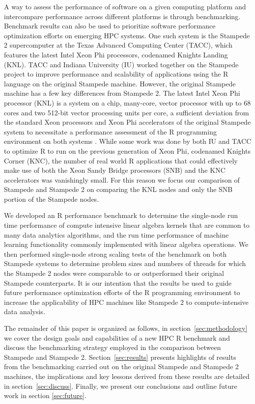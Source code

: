 A way to assess the performance of software on a given computing platform and intercompare
performance across different platforms is through benchmarking. Benchmark results can also
be used to prioritize software performance optimization efforts on emerging HPC systems.
One such system is the Stampede 2 supercomputer at the Texas Advanced Computing Center
(TACC), which features the latest Intel Xeon Phi processors, codenamed Knights Landing
(KNL). TACC and Indiana University (IU) worked together on the Stampede project to
improve performance and scalability of applications using the R language on the original
Stampede machine. However, the original Stampede machine has a few key differences from
Stampede 2. The latest Intel Xeon Phi processor (KNL) is a system on a chip, many-core, vector processor
with up to 68 cores and two 512-bit vector processing units per core, a sufficient
deviation from the standard Xeon processors and Xeon Phi accelerators of the original
Stampede system to necessitate a performance assessment of the R programming environment
on both systems \cite{tacc:stampedeGuide}. While some work was done by both IU and TACC to
optimize R to run on the previous generation of Xeon Phi, codenamed Knights Corner (KNC),
the number of real world R applications that could effectively make use of both the Xeon
Sandy Bridge processors (SNB) and the KNC accelerators was vanishingly small. For this
reason we focus our comparison of Stampede and Stampede 2 on comparing the KNL nodes and
only the SNB portion of the Stampede nodes.

We developed an R performance benchmark to determine the single-node run time performance
of compute intensive linear algebra kernels that are common to many data analytics
algorithms, and the run time performance of machine learning functionality commonly
implemented with linear algebra operations.  We then performed single-node strong scaling
tests of the benchmark on both Stampede systems to determine problem sizes and numbers of
threads for which the Stampede 2 nodes were comparable to or outperformed their original
Stampede counterparts.  It is our intention that the results be used to guide future
performance optimization efforts of the R programming environment to increase the
applicability of HPC machines like Stampede 2 to compute-intensive data
analysis.

The remainder of this paper is organized as follows, in section~\ref{sec:methodology} we
cover the design goals and capabilities of a new HPC R benchmark and discuss the
benchmarking strategy employed in the comparison between Stampede and Stampede 2.
Section~\ref{sec:results} presents highlights of results from the benchmarking carried out
on the original Stampede and Stampede 2 machines, the implications and key lessons derived
from these results are detailed in section~\ref{sec:discuss}. Finally, we present our
conclusions and outline future work in section \ref{sec:future}.

